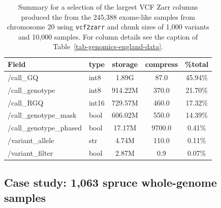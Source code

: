 \documentclass[a4paper,num-refs]{oup-contemporary}
\begin{document}
\begin{table}
\caption{Summary for a selection of the largest VCF Zarr columns produced 
the from the 245,388 exome-like samples from chromosome 20
using \texttt{vcf2zarr} and chunk sizes of 1,000 variants and 
10,000 samples.
For column details see the caption of Table~\ref{tab-genomics-england-data}.
\label{tab-all-of-us-data}}
\begin{tabular}{llS[table-format=3.2]S[table-format=3.2]S[table-format=3.2]}
\toprule
{Field} & {type} & {storage} & {compress} & {\%total} \\
\midrule
/call\_GQ & int8 & 1.89G & 87.0 & 45.94\% \\
/call\_genotype & int8 & 914.22M & 370.0 & 21.70\% \\
/call\_RGQ & int16 & 729.57M & 460.0 & 17.32\% \\
/call\_genotype\_mask & bool & 606.02M & 550.0 & 14.39\% \\
/call\_genotype\_phased & bool & 17.17M & 9700.0 & 0.41\% \\
/variant\_allele & str & 4.74M & 110.0 & 0.11\% \\
/variant\_filter & bool & 2.87M & 0.9 & 0.07\% \\
\bottomrule
\end{tabular}
\end{table}

\subsection{Case study: 1,063 spruce whole-genome samples}
\end{document}
